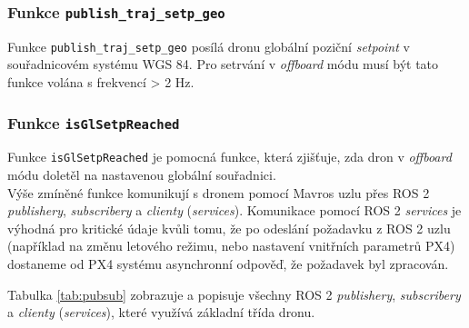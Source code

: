 \subsubsection{Funkce \texttt{publish\_traj\_setp\_geo}}

Funkce \texttt{publish\_traj\_setp\_geo} posílá dronu globální poziční \textit{setpoint} v souřadnicovém systému WGS 84. Pro setrvání v \textit{offboard} módu musí být tato funkce volána s frekvencí > 2 Hz.

\subsubsection{Funkce \texttt{isGlSetpReached}}

Funkce \texttt{isGlSetpReached} je pomocná funkce, která zjišťuje, zda dron v \textit{offboard} módu doletěl na nastavenou globální souřadnici.\\

Výše zmíněné funkce komunikují s dronem pomocí Mavros uzlu přes ROS 2 \textit{publishery}, \textit{subscribery} a \textit{clienty} (\textit{services}). Komunikace pomocí ROS 2 \textit{services} je výhodná pro kritické údaje kvůli tomu, že po odeslání požadavku z ROS 2 uzlu (například na změnu letového režimu, nebo nastavení vnitřních parametrů PX4) dostaneme od PX4 systému asynchronní odpověď, že požadavek byl zpracován.

Tabulka \ref{tab:pubsub} zobrazuje a popisuje všechny ROS 2 \textit{publishery}, \textit{subscribery} a \textit{clienty} (\textit{services}), které využívá základní třída dronu.

